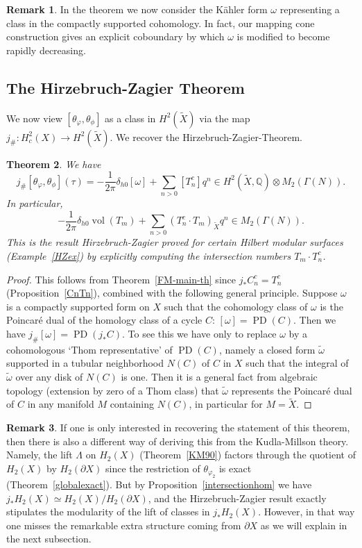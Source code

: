 \documentclass[12pt,leqno]{amsart}
\numberwithin{equation}{section}
\theoremstyle{plain}
\newtheorem{theorem}{Theorem}[section]
\theoremstyle{definition}
\newtheorem{remark}[theorem]{Remark}
\theoremstyle{remark}
\newcommand{\Q}{\mathbb{Q}}
\newcommand{\G}{\Gamma}
\newcommand{\vol}{\operatorname{vol}}
\newcommand{\PD}{\operatorname{PD}}
\begin{document}
\begin{remark}
In the theorem we now consider the K\"ahler form $\omega$ representing a class in the compactly supported cohomology. In fact, our mapping cone construction gives an explicit coboundary by which $\omega$ is modified to become rapidly decreasing. 
\end{remark}

\subsection{The Hirzebruch-Zagier Theorem} 

We now view $[\theta_{\varphi}, \theta_{\phi}]$ as a class in $H^2(\tilde{X})$ via the map $j_{\#}: H_c^2(X) \to H^2(\tilde{X})$. We recover the Hirzebruch-Zagier-Theorem. 

\begin{theorem}\label{HZTheorem}
We have 
\[
j_{\#}[\theta_{\varphi}, \theta_{\phi}](\tau) =  -\frac{1}{2\pi}\delta_{h0} [\omega] + \sum_{n>0} [T^c_n] q^n \in H^2(\tilde{X},\Q) \otimes M_2(\G(N)).
\]
In particular,
\[
 -\frac{1}{2\pi}\delta_{h0} \vol(T_m) + \sum_{n>0} (T_n^c \cdot T_m)_{\tilde{X}} q^n \in M_2(\G(N)).
\]
This is the result Hirzebruch-Zagier proved for certain Hilbert modular surfaces (Example~\ref{HZex}) by explicitly computing the intersection numbers $T_m \cdot T^c_n $.
\end{theorem}

\begin{proof}

This follows from Theorem~\ref{FM-main-th} since $j_{\ast} C_n^c = T_n^c$ (Proposition~\ref{CnTn}), combined with the following general principle.
Suppose $\omega$ is a compactly supported form on $X$ such that the cohomology class of $\omega$ is the Poincar\'e dual of the homology class of a cycle $C$: $[\omega] = \PD(C)$. Then we have $ j_{\#}[\omega] = \PD( j_* C)$.
To see this we have only to replace $\omega$ by a cohomologous  `Thom representative' of $\PD(C)$, namely a closed form $\tilde{\omega}$ supported in a tubular neighborhood $N(C)$ of $C$ in $X$ such that the integral of $\tilde{\omega}$ over any disk of $N(C)$ is one. Then it is a general fact from algebraic topology (extension by zero of a Thom class)  that $\tilde{\omega}$ represents the Poincar\'e dual of $C$ in any manifold $M$ containing $N(C)$, in particular for $M = \tilde{X}$.
\end{proof}


\begin{remark}
If one is only interested in recovering the statement of this theorem, then there is also a different way of deriving this from the Kudla-Millson theory. Namely, the lift $\Lambda$ on $H_2(X)$ (Theorem~\ref{KM90}) factors through the quotient of $H_2(X)$ by $H_2(\partial X)$ since the restriction of $\theta_{\varphi_2}$ is exact (Theorem~\ref{globalexact}). But by Proposition~\ref{intersectionhom} we have $j_{\ast} H_2(X) \simeq H_2(X)/  H_2(\partial X)$, and the Hirzebruch-Zagier result exactly stipulates the modularity of the lift of classes in $j_{\ast} H_2(X)$. However, in that way one misses the  remarkable  extra structure coming from $\partial X$ as we will explain in the next subsection.
\end{remark}
\end{document}
